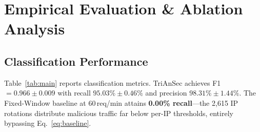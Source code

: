 \documentclass[journal,10pt]{IEEEtran}
\begin{document}
\section{Empirical Evaluation \& Ablation Analysis}
\label{sec:eval}

\subsection{Classification Performance}
Table~\ref{tab:main} reports classification metrics. TriAnSec achieves F1 $=0.966\pm0.009$ with recall $95.03\%\pm0.46\%$ and precision $98.31\%\pm1.44\%$. The Fixed-Window baseline at 60\,req/min attains \textbf{0.00\% recall}---the 2,615 IP rotations distribute malicious traffic far below per-IP thresholds, entirely bypassing Eq.~\eqref{eq:baseline}.
\end{document}
